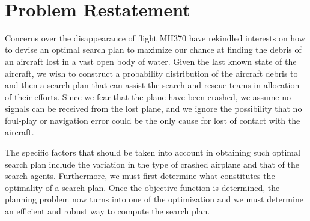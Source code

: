 \documentclass[12pt, letterpaper]{article}  %
\theoremstyle{definition}
\theoremstyle{remark}
\theoremstyle{plain}
\begin{document}
\newpage



   \doublespacing


\tableofcontents
\ \\

\newpage

\setcounter{page}{1}   




\section{Problem Restatement}\label{sec:restate}

Concerns over the disappearance of flight MH370 have rekindled interests on how to devise an optimal search plan to maximize our chance at finding the debris of an aircraft lost in a vast open body of water. Given the last known state of the aircraft, we wish to construct a probability distribution of the aircraft debris to and then a search plan that can assist the search-and-rescue teams in allocation of their efforts. Since we fear that the plane have been crashed, we assume no signals can be received from the lost plane, and we ignore the possibility that no foul-play or navigation error could be the only cause for lost of contact with the aircraft.

The specific factors that should be taken into account in obtaining such optimal search plan
include the variation in the type of crashed airplane and that of the search agents. Furthermore, we must first determine what constitutes the optimality of a search plan. Once the objective function is determined, the planning problem now turns into one of the optimization and we must
determine an efficient and robust way to compute the search plan.


\end{document}
